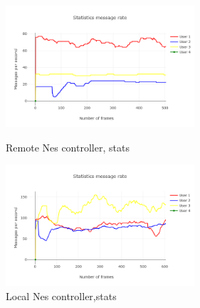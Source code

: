 \documentclass{l4proj}
\begin{document}
\begin{appendices}
\begin{figure}[h!]
    \centering
    \begin{minipage}{0.45\textwidth}
        \centering
        \includegraphics[width=7cm]{./images/rnessstats.png} %
        \caption{Remote Nes controller, stats}
        \label{rnesstats}
    \end{minipage}\hfill
    \begin{minipage}{0.45\textwidth}
        \centering
        \includegraphics[width=7cm]{./images/lnessstats.png} %
        \caption{Local Nes controller,stats}
        \label{lnesstats}
    \end{minipage}
\end{figure}


\end{appendices}
\end{document}
